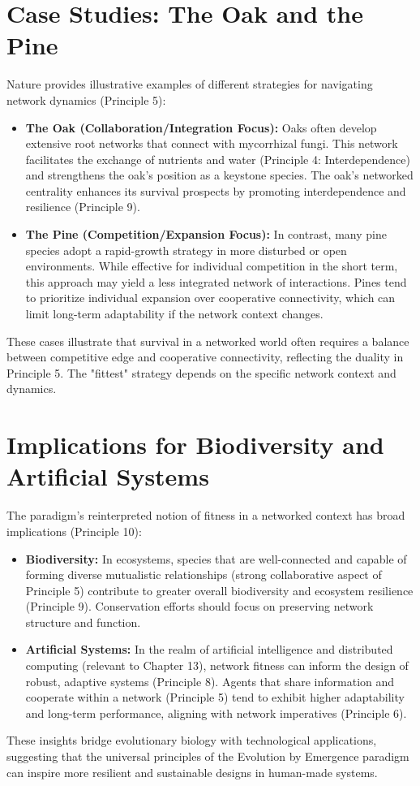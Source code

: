 \section{Case Studies: The Oak and the Pine}
Nature provides illustrative examples of different strategies for navigating network dynamics (Principle 5):
\begin{itemize}
    \item \textbf{The Oak (Collaboration/Integration Focus):} Oaks often develop extensive root networks that connect with mycorrhizal fungi. This network facilitates the exchange of nutrients and water (Principle 4: Interdependence) and strengthens the oak's position as a keystone species. The oak’s networked centrality enhances its survival prospects by promoting interdependence and resilience (Principle 9).
    \item \textbf{The Pine (Competition/Expansion Focus):} In contrast, many pine species adopt a rapid-growth strategy in more disturbed or open environments. While effective for individual competition in the short term, this approach may yield a less integrated network of interactions. Pines tend to prioritize individual expansion over cooperative connectivity, which can limit long-term adaptability if the network context changes.
\end{itemize}
These cases illustrate that survival in a networked world often requires a balance between competitive edge and cooperative connectivity, reflecting the duality in Principle 5. The "fittest" strategy depends on the specific network context and dynamics. %

\section{Implications for Biodiversity and Artificial Systems}
The paradigm's reinterpreted notion of fitness in a networked context has broad implications (Principle 10):
\begin{itemize}
    \item \textbf{Biodiversity:} In ecosystems, species that are well-connected and capable of forming diverse mutualistic relationships (strong collaborative aspect of Principle 5) contribute to greater overall biodiversity and ecosystem resilience (Principle 9). Conservation efforts should focus on preserving network structure and function.
    \item \textbf{Artificial Systems:} In the realm of artificial intelligence and distributed computing (relevant to Chapter 13), network fitness can inform the design of robust, adaptive systems (Principle 8). Agents that share information and cooperate within a network (Principle 5) tend to exhibit higher adaptability and long-term performance, aligning with network imperatives (Principle 6).
\end{itemize}
These insights bridge evolutionary biology with technological applications, suggesting that the universal principles of the Evolution by Emergence paradigm can inspire more resilient and sustainable designs in human-made systems. %

